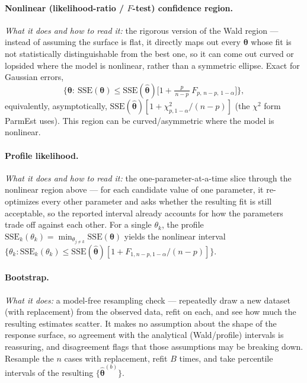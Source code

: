 \documentclass[11pt]{article}
\newcommand{\thetahat}{\hat{\boldsymbol\theta}}
\newcommand{\SSE}{\mathrm{SSE}}
\begin{document}
\paragraph{Nonlinear (likelihood-ratio / $F$-test) confidence region.}
\emph{What it does and how to read it:} the rigorous version of the Wald
region --- instead of assuming the surface is flat, it directly maps out
every $\boldsymbol\theta$ whose fit is not statistically distinguishable from
the best one, so it can come out curved or lopsided where the model is
nonlinear, rather than a symmetric ellipse. Exact for
Gaussian errors,
\begin{equation}
  \Big\{\boldsymbol\theta:\ \SSE(\boldsymbol\theta)\le
    \SSE(\thetahat)\Big[1+\tfrac{p}{\,n-p\,}\,F_{p,\,n-p,\,1-\alpha}\Big]\Big\},
  \label{eq:ftest}
\end{equation}
equivalently, asymptotically, $\SSE(\thetahat)[1+\chi^2_{p,1-\alpha}/(n-p)]$
(the $\chi^2$ form ParmEst uses). This region can be curved/asymmetric where the
model is nonlinear.

\paragraph{Profile likelihood.} \emph{What it does and how to read it:} the
one-parameter-at-a-time slice through the nonlinear region above --- for each
candidate value of one parameter, it re-optimizes every other parameter and
asks whether the resulting fit is still acceptable, so the reported interval
already accounts for how the parameters trade off against each other. For a
single $\theta_k$, the profile
$\SSE_k(\theta_k)=\min_{\theta_{j\ne k}}\SSE(\boldsymbol\theta)$ yields the
nonlinear interval $\{\theta_k:\SSE_k(\theta_k)\le
\SSE(\thetahat)[1+F_{1,n-p,1-\alpha}/(n-p)]\}$.

\paragraph{Bootstrap.} \emph{What it does:} a model-free resampling check ---
repeatedly draw a new dataset (with replacement) from the observed data,
refit on each, and see how much the resulting estimates scatter. It makes no
assumption about the shape of the response surface, so agreement with the
analytical (Wald/profile) intervals is reassuring, and disagreement flags
that those assumptions may be breaking down. Resample the $n$ cases with
replacement, refit $B$ times,
and take percentile intervals of the resulting $\{\thetahat^{(b)}\}$.
\end{document}

